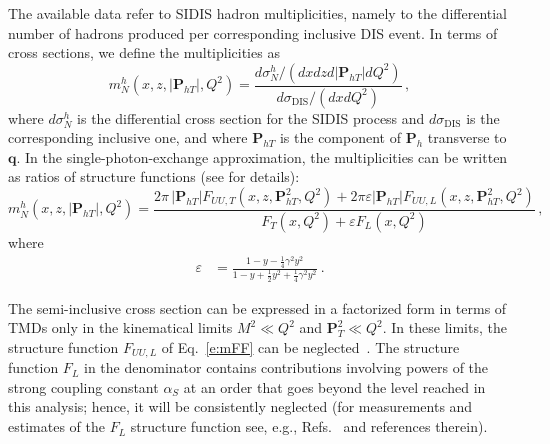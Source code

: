 \documentclass[aps,preprintnumbers,showpacs,nofootinbib,superscriptaddress,floatfix]{revtex4}
\newcommand{\Tperp}{T}
\begin{document}
The available data refer to SIDIS hadron multiplicities, namely to the differential number of hadrons produced per corresponding inclusive DIS event. In terms of cross sections, we define the multiplicities as
\begin{equation}
m_N^h (x,z,|\bm{P}_{h\Tperp}|, Q^2) = \frac{d \sigma_N^h / ( dx  dz d|\bm{P}_{h\Tperp}| dQ^2) }
                                                                   {d\sigma_{\text{DIS}} / ( dx dQ^2 ) }\, ,
\label{e:multiplicity}
\end{equation}
where $d\sigma_N^h$ is the differential cross section for the SIDIS process and $d\sigma_{\text{DIS}}$ is the corresponding inclusive one, 
and where \( \bm{P}_{h\Tperp} \) is the component of \( \bm{P}_{h} \) transverse to \( \bm{q} \). 
In the single-photon-exchange approximation, the multiplicities can be written as ratios of
structure functions (see \cite{Bacchetta:2006tn} for details):
\begin{equation}
m_N^h (x,z,|\bm{P}_{h\Tperp}|, Q^2) =   
\frac{2 \pi\,|\bm{P}_{h\Tperp}| F_{UU ,T}(x,z,\bm{P}_{h\Tperp}^2, Q^2) + 2 \pi
  \varepsilon |\bm{P}_{h\Tperp}| F_{UU ,L}(x,z,\bm{P}_{h\Tperp}^2, Q^2)}
        {F_{T}(x,Q^2) + \varepsilon  F_{L}(x,Q^2)} \, ,
 \label{e:mFF}
\end{equation} 
where
\begin{align}
\varepsilon &= \frac{1-y -\frac{1}{4} \gamma^2 y^2}{1-y+\frac{1}{2} y^2 +\frac{1}{4} \gamma^2 y^2} \ .
\end{align}  

The semi-inclusive cross section can be expressed in a factorized form in
terms of TMDs only in the kinematical limits $M^2 \ll Q^2$ and $\bm{P}_T^2 \ll
Q^2$. In these limits, the structure function $F_{UU,L}$ of Eq.~\eqref{e:mFF}
can be neglected~\cite{Bacchetta:2008xw}. 
 The structure function $F_L$ in the denominator contains contributions
 involving powers of the strong coupling constant $\alpha_S$ at an order that
 goes beyond the level reached in this analysis; 
hence, it will be
 consistently neglected (for measurements and
 estimates of the $F_L$ structure function see, e.g.,
 Refs.~\cite{Chekanov:2009na,Andreev:2013vha} and references therein).  
\end{document}
